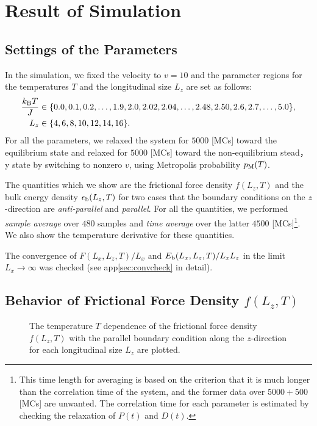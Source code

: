 \chapter{Result of Simulation}

\section{Settings of the Parameters}

In the simulation, we fixed the velocity to $v=10$ and the parameter regions for the temperatures $T$ and the longitudinal size $L_{z}$ are set as follows:
\begin{align}
\frac{k_{\rm B}T}{J}&\in\{0.0,0.1,0.2,\dots,1.9,2.0,2.02,2.04,\dots,2.48,2.50,2.6,2.7,\dots,5.0\},\\
L_{z}&\in\{4,6,8,10,12,14,16\}.
\end{align}
For all the parameters, we relaxed the system for $5000$ [MCs] toward the equilibrium state and relaxed for $5000$ [MCs] toward the non-equilibrium stead，y state by switching to nonzero $v$, using Metropolis probability $p_{\rm M}(T)$.

The quantities which we show are the  frictional force density $f(L_{z}, T)$ and the bulk energy density $\epsilon_{\rm b}(L_{z}, T)$ for two cases that the boundary conditions on the $z$-direction are \textit{anti-parallel} and \textit{parallel}. For all the quantities, we performed \textit{sample average} over $480$ samples and \textit{time average} over the latter $4500$ [MCs]\footnote{This time length for averaging is based on the criterion that it is much longer than the correlation time of the system, and the former data over $5000 + 500$ [MCs] are unwanted. The correlation time for each parameter is estimated by checking the relaxation of $P(t)$ and $D(t)$.}. We also show the temperature derivative for these quantities.

The convergence of $F(L_{x},L_{z},T)/L_{x}$ and $E_{\rm b}(L_{x},L_{z},T)/L_{x}L_{z}$ in the limit $L_{x}\to\infty$ was checked (see app\ref{sec:convcheck} in detail).

\section{Behavior of Frictional Force Density $f(L_{z}, T)$}

\begin{figure}[htbp]
	\centering
	
	\caption{The temperature $T$ dependence of the frictional force density $f(L_{z}, T)$ with the parallel boundary condition along the $z$-direction for each longitudinal size $L_{z}$ are plotted.}
\end{figure}

